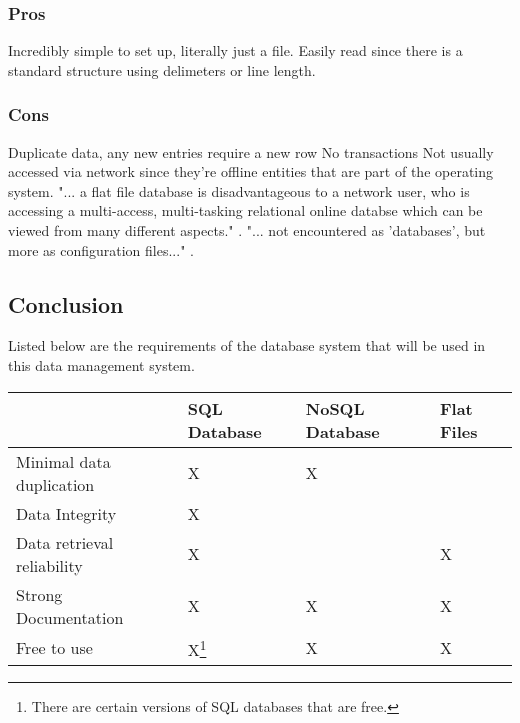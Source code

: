 \documentclass[draftclsnofoot,onecolumn,letterpaper,10pt,compsoc]{IEEEtran}
\begin{document}
        \subsubsection{Pros}
            Incredibly simple to set up, literally just a file.
            Easily read since there is a standard structure using delimeters or line length.
    
        \subsubsection{Cons}
            Duplicate data, any new entries require a new row
            No transactions
            Not usually accessed via network since they're offline entities that are part of the operating system\cite{Techwalla}.
            "... a flat file database is disadvantageous to a network user, who is accessing a multi-access, multi-tasking relational online databse which can be viewed from many different aspects." \cite{Techwalla}.
            "... not encountered as 'databases', but more as configuration files..." \cite{Techwalla}.
    
    \subsection{Conclusion}
        Listed below are the requirements of the database system that will be used in this data management system.
        
        \begin{center}
            \begin{tabular}{| m{15em} | m{10em} | m{10em} | m{10em} |}
                \hline
                    & SQL Database & NoSQL Database & Flat Files \\
                
                \hline
                    Minimal data duplication & X & X & \\
                    
                \hline
                    Data Integrity & X &  &  \\
                
                \hline
                    Data retrieval reliability & X &  & X \\
                    
                \hline
                    Strong Documentation & X & X & X \\
                    
                \hline
                    Free to use & X\footnote{There are certain versions of SQL databases that are free.} & X & X \\
                    
                \hline
            \end{tabular}
        \end{center}
\end{document}
